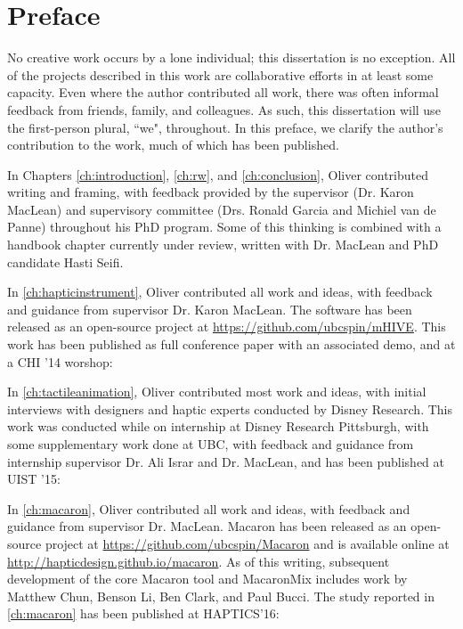 
\chapter{Preface}
No creative work occurs by a lone individual; this dissertation is no exception.
All of the projects described in this work are collaborative efforts in at least some capacity.
Even where the author contributed all work, there was often informal feedback from friends, family, and colleagues.
As such, this dissertation will use the first-person plural, ``we", throughout.
In this preface, we clarify the author's contribution to the work, much of which has been published.

In Chapters \ref{ch:introduction}, \ref{ch:rw}, and \ref{ch:conclusion}, Oliver contributed writing and framing, with feedback provided by the supervisor (Dr. Karon MacLean) and supervisory committee (Drs. Ronald Garcia and Michiel van de Panne) throughout his PhD program. 
Some of this thinking is combined with a handbook chapter currently under review, written with Dr. MacLean and PhD candidate Hasti Seifi.

In \autoref{ch:hapticinstrument}, Oliver contributed all work and ideas, with feedback and guidance from supervisor Dr. Karon MacLean.
The software has been released as an open-source project at \url{https://github.com/ubcspin/mHIVE}.
This work has been published as full conference paper with an associated demo, and at a CHI '14 worshop:


\noindent
In \autoref{ch:tactileanimation}, Oliver contributed most work and ideas, with initial interviews with designers and haptic experts conducted by Disney Research.
This work was conducted while on internship at Disney Research Pittsburgh, with some supplementary work done at UBC, with feedback and guidance from internship supervisor Dr. Ali Israr and Dr. MacLean, and has been published at UIST '15:


\noindent
In \autoref{ch:macaron}, Oliver contributed all work and ideas, with feedback and guidance from supervisor Dr. MacLean.
Macaron has been released as an open-source project at \url{https://github.com/ubcspin/Macaron} and is available online at \url{http://hapticdesign.github.io/macaron}.
As of this writing, subsequent development of the core Macaron tool and MacaronMix includes work by Matthew Chun, Benson Li, Ben Clark, and Paul Bucci.
The study reported in \autoref{ch:macaron} has been published at HAPTICS'16: 

